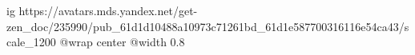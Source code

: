  
 
 
 
 

\ifcmt
  ig https://avatars.mds.yandex.net/get-zen_doc/235990/pub_61d1d10488a10973c71261bd_61d1e587700316116e54ca43/scale_1200
	@wrap center
	@width 0.8
\fi
